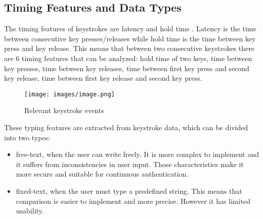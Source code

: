 \subsection{Timing Features and Data Types}
The timing features of keystrokes are latency and hold time \cite{ref:air force intro}. Latency is the time between consecutive key presses/releases while hold time is the time between key press and key release. This means that between two consecutive keystrokes there are 6 timing features that can be analyzed: hold time of two keys, time between key presses, time between key releases, time between first key press and second key release, time between first key release and second key press.\\

\begin{figure}[h]
    \centering
    \texttt{[image: images/image.png]}
    \caption{Relevant keystroke events}
\end{figure}

These typing features are extracted from keystroke data, which can be divided into two types:
\begin{itemize}
    \item free-text, when the user can write freely. It is more complex to implement and it suffers from inconsistencies in user input. Those characteristics make it more secure and suitable for continuous authentication.
    \item fixed-text, when the user must type a predefined string. This means that comparison is easier to implement and more precise. However it has limited usability.
\end{itemize}